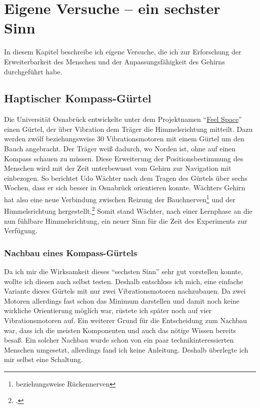 \section{Eigene Versuche -- ein sechster Sinn}
\label{sec:Robin:experiments}
In diesem Kapitel beschreibe ich eigene Versuche, die ich zur Erforschung der Erweiterbarkeit
des Menschen und der Anpassungsfähigkeit des Gehirns durchgeführt habe.


\newcommand{\Linkfeelspace}%
{\enquote{\href{http://feelspace.cogsci.uni-osnabrueck.de/}{Feel Space}}}
\subsection{Haptischer Kompass-Gürtel}
Die Universität Osnabrück entwickelte unter dem Projektnamen \Linkfeelspace{}
einen Gürtel, der über Vibration dem Träger die Himmelsrichtung mitteilt.
Dazu werden zwölf beziehungsweise 30 Vibrationsmotoren mit einem Gürtel um den Bauch angebracht.
Der Träger weiß dadurch, wo Norden ist,
ohne auf einen Kompass schauen zu müssen. Diese Erweiterung der Positionsbestimmung des Menschen
wird mit der Zeit unterbewusst vom Gehirn zur Navigation mit einbezogen. So berichtet Udo Wächter
nach dem Tragen des Gürtels über sechs Wochen, dass er sich besser in Osnabrück orientieren konnte.
Wächters Gehirn hat also eine neue Verbindung zwischen Reizung der
Bauchnerven\footnote{beziehungsweise Rückennerven} und der
Himmelsrichtung hergestellt.\footcite{noz:compass_belt}
Somit stand Wächter, nach einer Lernphase an die nun fühlbare Himmelsrichtung, ein neuer
Sinn für die Zeit des Experiments zur Verfügung.

\subsubsection{Nachbau eines Kompass-Gürtels}
\label{sec:Robin:experiments:myCompassBelt}
Da ich mir die Wirksamkeit dieses \enquote{sechsten Sinn} sehr gut vorstellen konnte, wollte
ich diesen auch selbst testen. Deshalb entschloss ich mich, eine einfache Variante dieses Gürtels
mit nur zwei Vibrationsmotoren nachzubauen. Da zwei Motoren allerdings fast schon das Minimum
darstellen und
damit noch keine wirkliche Orientierung möglich war, rüstete ich später noch auf vier Vibrationsmotoren
auf.
Ein weiterer Grund für die Entscheidung zum Nachbau war,
dass ich die meisten Komponenten und auch das nötige Wissen bereits besaß. Ein solcher Nachbau wurde
schon von ein paar technikinteressierten Menschen umgesetzt, allerdings fand ich keine Anleitung.
Deshalb überlegte ich mir selbst eine Schaltung.

